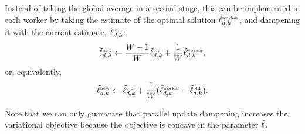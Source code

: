 Instead of taking the global average in a second stage, this can be
implemented in each worker by taking the estimate of the optimal
solution $\tilde{\ell}^{\mbox{\tiny worker}}_{d,k}$, and dampening it with
the current estimate, $\tilde{\ell}^{\mbox{\tiny old}}_{d,k}$:
 \[
  \tilde{\ell}^{\mbox{\tiny new}}_{d,k} \gets \frac{W - 1}{W} \tilde{\ell}^{\mbox{\tiny old}}_{d,k} + \frac{1}{W} \tilde{\ell}^{\mbox{\tiny worker}}_{d,k},
\]
or, equivalently,
 \[
 \tilde{\ell}^{\mbox{\tiny new}}_{d,k} \gets \tilde{\ell}^{\mbox{\tiny old}}_{d,k} + \frac{1}{W} (\tilde{\ell}^{\mbox{\tiny worker}}_{d,k} - \tilde{\ell}^{\mbox{\tiny old}}_{d,k}).
\]

Note that we can only guarantee that parallel update dampening
increases the variational objective because the objective is concave
in the parameter $\tilde{\ell}$.
